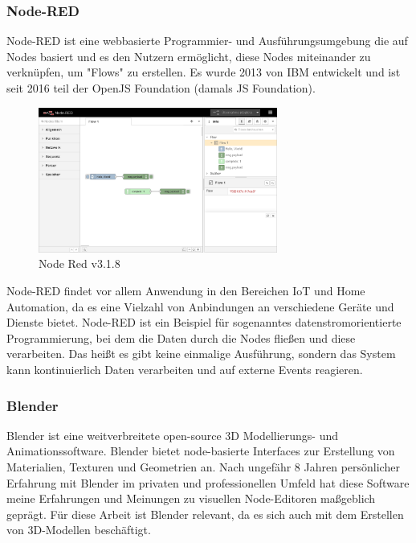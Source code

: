 \documentclass[ngerman]{article}
\begin{document}
\subsubsection{Node-RED}

Node-RED ist eine webbasierte Programmier- und Ausführungsumgebung die auf Nodes basiert und es den Nutzern ermöglicht, diese Nodes miteinander zu verknüpfen, um "Flows" zu erstellen. 
Es wurde 2013 von IBM entwickelt und ist seit 2016 teil der OpenJS Foundation (damals JS Foundation).
\cite{nodered}



\begin{figure}[htbp]
  \centering
  \includegraphics[width=0.7\textwidth]{./graphics/node-red-3_1_8.png}
  \caption{Node Red v3.1.8}
  \label{fig:}
\end{figure}

Node-RED findet vor allem Anwendung in den Bereichen IoT und Home Automation, da es eine Vielzahl von Anbindungen an verschiedene Geräte und Dienste bietet. 
Node-RED ist ein Beispiel für sogenanntes datenstromorientierte Programmierung, bei dem die Daten durch die Nodes fließen und diese verarbeiten. Das heißt es gibt keine einmalige Ausführung, sondern das System kann kontinuierlich Daten verarbeiten und auf externe Events reagieren.

\pagebreak
\subsubsection{Blender}
Blender ist eine weitverbreitete open-source 3D Modellierungs- und Animationssoftware. Blender bietet node-basierte Interfaces zur Erstellung von Materialien, Texturen und Geometrien an. Nach ungefähr 8 Jahren persönlicher Erfahrung mit Blender im privaten und professionellen Umfeld hat diese Software meine Erfahrungen und Meinungen zu visuellen Node-Editoren maßgeblich geprägt.
Für diese Arbeit ist Blender relevant, da es sich auch mit dem Erstellen von 3D-Modellen beschäftigt.
\cite{blender}
\end{document}
